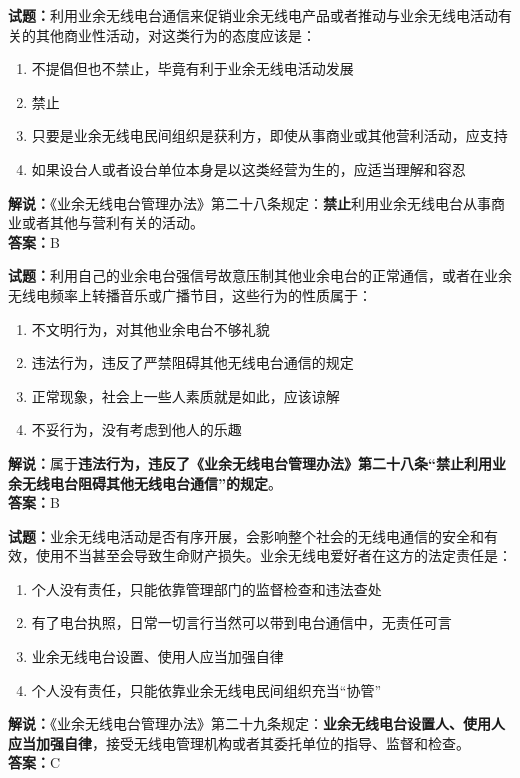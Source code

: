 \documentclass{ctexbook}
\begin{document}
\vspace{1em}

\textbf{试题：}利用业余无线电台通信来促销业余无线电产品或者推动与业余无线电活动有关的其他商业性活动，对这类行为的态度应该是：
\begin{enumerate}[leftmargin=3em]
  \item 不提倡但也不禁止，毕竟有利于业余无线电活动发展
  \item 禁止
  \item 只要是业余无线电民间组织是获利方，即使从事商业或其他营利活动，应支持
  \item 如果设台人或者设台单位本身是以这类经营为生的，应适当理解和容忍
\end{enumerate}
\noindent\textbf{解说：}《业余无线电台管理办法》第二十八条规定：\textbf{禁止}利用业余无线电台从事商业或者其他与营利有关的活动。\\\noindent\textbf{答案：}B

\vspace{1em}

\textbf{试题：}利用自己的业余电台强信号故意压制其他业余电台的正常通信，或者在业余无线电频率上转播音乐或广播节目，这些行为的性质属于：
\begin{enumerate}[leftmargin=3em]
  \item 不文明行为，对其他业余电台不够礼貌
  \item 违法行为，违反了严禁阻碍其他无线电台通信的规定
  \item 正常现象，社会上一些人素质就是如此，应该谅解
  \item 不妥行为，没有考虑到他人的乐趣
\end{enumerate}
\noindent\textbf{解说：}属于\textbf{违法行为，违反了《业余无线电台管理办法》第二十八条“禁止利用业余无线电台阻碍其他无线电台通信”的规定}。\\\noindent\textbf{答案：}B

\vspace{1em}

\textbf{试题：}业余无线电活动是否有序开展，会影响整个社会的无线电通信的安全和有效，使用不当甚至会导致生命财产损失。业余无线电爱好者在这方的法定责任是：
\begin{enumerate}[leftmargin=3em]
  \item 个人没有责任，只能依靠管理部门的监督检查和违法查处
  \item 有了电台执照，日常一切言行当然可以带到电台通信中，无责任可言
  \item 业余无线电台设置、使用人应当加强自律
  \item 个人没有责任，只能依靠业余无线电民间组织充当“协管”
\end{enumerate}
\noindent\textbf{解说：}《业余无线电台管理办法》第二十九条规定：\textbf{业余无线电台设置人、使用人应当加强自律}，接受无线电管理机构或者其委托单位的指导、监督和检查。\\\noindent\textbf{答案：}C
\end{document}
